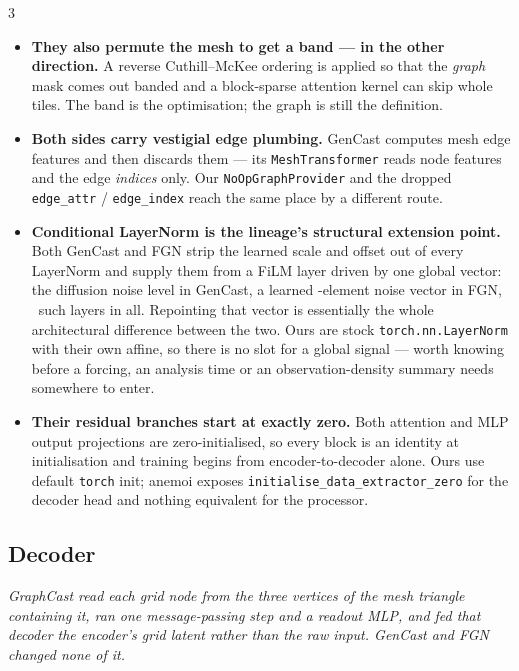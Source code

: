 \documentclass[11pt,landscape]{article}
\begin{document}
\begin{multicols}{3}
\begin{itemize}[leftmargin=1.1em]
  \item \textbf{They also permute the mesh to get a band --- in the other
    direction.}  A reverse Cuthill--McKee ordering is applied so that the
    \emph{graph} mask comes out banded and a block-sparse attention kernel can
    skip whole tiles.  The band is the optimisation; the graph is still the
    definition.

  \item \textbf{Both sides carry vestigial edge plumbing.}  GenCast computes mesh
    edge features and then discards them --- its {\tt MeshTransformer} reads node
    features and the edge \emph{indices} only.  Our {\tt NoOpGraphProvider} and
    the dropped {\tt edge\_attr} / {\tt edge\_index} reach the same place by a
    different route.

  \item \textbf{Conditional LayerNorm is the lineage's structural extension
    point.}  Both GenCast and FGN strip the learned scale and offset out of every
    LayerNorm and supply them from a FiLM layer driven by one global vector: the
    diffusion noise level in GenCast, a learned \fgnnoisedim-element noise vector
    in FGN, \fgnfilmlayers\ such layers in all.  Repointing that vector is
    essentially the whole architectural difference between the two.  Ours are
    stock {\tt torch.nn.LayerNorm} with their own affine, so there is no slot for
    a global signal --- worth knowing before a forcing, an analysis time or an
    observation-density summary needs somewhere to enter.

  \item \textbf{Their residual branches start at exactly zero.}  Both attention
    and MLP output projections are zero-initialised, so every block is an
    identity at initialisation and training begins from encoder-to-decoder alone.
    Ours use default {\tt torch} init; anemoi exposes
    {\tt initialise\_data\_extractor\_zero} for the decoder head and nothing
    equivalent for the processor.

\end{itemize}


\subsection*{Decoder}

\textit{GraphCast read each grid node from the three vertices of the mesh
triangle containing it, ran one message-passing step and a readout MLP, and fed
that decoder the \emph{encoder's} grid latent rather than the raw input.  GenCast
and FGN changed none of it.}


\end{multicols}
\end{document}
